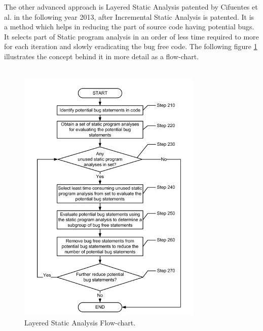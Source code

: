 The other advanced approach is Layered Static Analysis patented by Cifuentes et al. in the following year 2013, after Incremental Static Analysis is patented. It is a method which helps in reducing the part of source code having potential bugs. It selects part of Static program analysis in an order of less time required to more for each iteration and slowly eradicating the bug free code. The following figure \ref{fig:lay-analysis-fc} illustrates the concept behind it in more detail as a flow-chart. \\ \\

\begin{figure}[H]
	\centering
	\includegraphics[width=\linewidth]{figures/lay-analysis-fc}
	\caption{Layered Static Analysis Flow-chart.}
	\label{fig:lay-analysis-fc}
\end{figure}


